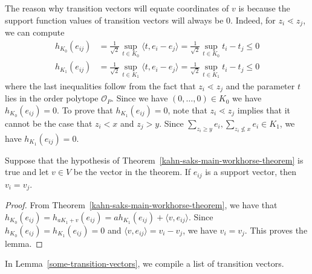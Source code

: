 \documentclass{puthesis-UG}
\begin{document}
The reason why transition vectors will equate coordinates of $v$ is because the support function values of transition vectors will always be $0$. Indeed, for $z_i \lessdot z_j$, we can compute 
\begin{align*}
    h_{K_0}(e_{ij}) & = \frac{1}{\sqrt{2}} \sup_{t \in K_0} \langle t, e_i - e_j \rangle = \frac{1}{\sqrt{2}} \sup_{t \in K_0} t_i - t_j \leq 0 \\
    h_{K_1} (e_{ij}) & = \frac{1}{\sqrt{2}} \sup_{t \in K_1} \langle t, e_i - e_j \rangle  = \frac{1}{\sqrt{2}} \sup_{t \in K_1} t_i - t_j \leq 0
\end{align*}
where the last inequalities follow from the fact that $z_i\lessdot z_j$ and the parameter $t$ lies in the order polytope $\mathcal{O}_P$. Since we have $(0, \ldots, 0) \in K_0$ we have $h_{K_0}(e_{ij}) = 0$. To prove that $h_{K_1}(e_{ij}) = 0$, note that $z_i \lessdot z_j$ implies that it cannot be the case that $z_i < x$ and $z_j > y$. Since $\sum_{z_i \geq y} e_i , \sum_{z_i \not \leq x} e_i \in K_1$, we have $h_{K_1}(e_{ij}) = 0$.


\begin{cor} \label{transition-vector-implies-equality}
    Suppose that the hypothesis of Theorem~\ref{kahn-saks-main-workhorse-theorem} is true and let $v \in V$ be the vector in the theorem. If $e_{ij}$ is a support vector, then $v_i = v_j$.  
\end{cor}

\begin{proof}
    From Theorem~\ref{kahn-saks-main-workhorse-theorem}, we have that $h_{K_0}(e_{ij}) = h_{aK_1 + v}(e_{ij}) = a h_{K_1} (e_{ij}) + \langle v, e_{ij} \rangle$. Since $h_{K_0}(e_{ij}) = h_{K_1}(e_{ij}) = 0$ and $\langle v, e_{ij} \rangle = v_i - v_j$, we have $v_i = v_j$. This proves the lemma. 
\end{proof}
In Lemma~\ref{some-transition-vectors}, we compile a list of transition vectors. 
\end{document}
